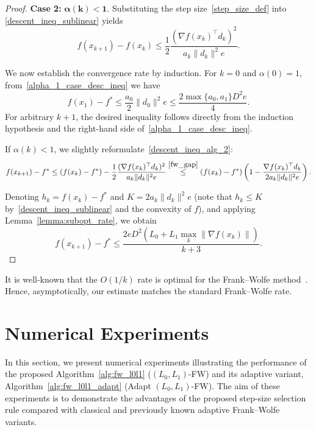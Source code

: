 \documentclass[runningheads]{llncs}
\begin{document}
\begin{proof}
		\medskip
		\noindent
		\textbf{Case 2:} $\boldsymbol{\alpha(k) < 1.}$  
		Substituting the step size~\eqref{step_size_def} into
		\eqref{descent_ineq_sublinear} yields
		\begin{equation}\label{descent_ineq_alg_2_step_size_less_1}
			f(x_{k+1}) - f(x_k)
			\leq
			\frac{1}{2}
			\frac{(\nabla f(x_k)^\top d_k)^2}{
				a_k \|d_k\|^2 e}.
		\end{equation}
		
		We now establish the convergence rate by induction.
		For $k=0$ and $\alpha(0)=1$, from~\eqref{alpha_1_case_desc_ineq} we have
		\[
		f(x_{1}) - f^*
		\leq \frac{a_0}{2} \|d_0\|^2 e
		\leq \frac{2 \max \{a_0, a_1\} D^2 e}{4}.
		\]
		For arbitrary $k + 1$, the desired inequality follows directly from the induction hypothesis and the right-hand side of~\eqref{alpha_1_case_desc_ineq}.
		
		If $\alpha(k) < 1$, we slightly reformulate~\eqref{descent_ineq_alg_2}:
		\[
		f(x_{k+1}) - f^*
		\leq (f(x_k) - f^*)
		- \frac{1}{2}
		\frac{(\nabla f(x_k)^\top d_k)^2}{
			a_k \|d_k\|^2 e}
		\overset{\eqref{fw_gap}}{\leq}
		(f(x_k) - f^*)
		\left(
		1 - \frac{\nabla f(x_k)^\top d_k}{
			2 a_k \|d_k\|^2 e}
		\right).
		\]
		
		Denoting $h_k = f(x_k) - f^*$ and $K = 2 a_k \|d_k\|^2 e$ (note that $h_k \leq K$ by~\eqref{descent_ineq_sublinear} and the convexity of $f$), and applying Lemma~\ref{lemma:subopt_rate}, we obtain
		\[
		f(x_{k+1}) - f^* \leq
		\frac{2eD^2 \left( L_0 + L_1 \max_k \|\nabla f(x_k)\| \right)}{k + 3}.
		\]
	\end{proof}
	
	It is well-known that the $O(1/k)$ rate is optimal for the Frank--Wolfe method~\cite{polyak1983introduction}.  
	Hence, asymptotically, our estimate matches the standard Frank--Wolfe rate.
	
	
	\section{Numerical Experiments}\label{sec_numerical_experiments}
	
	In this section, we present numerical experiments illustrating the performance of the proposed Algorithm~\ref{alg:fw_l0l1} ($(L_0,L_1)$-FW) and its adaptive variant, Algorithm~\ref{alg:fw_l0l1_adapt} (Adapt $(L_0,L_1)$-FW).  
	The aim of these experiments is to demonstrate the advantages of the proposed step-size selection rule compared with classical and previously known adaptive Frank--Wolfe variants.
	
\end{document}
